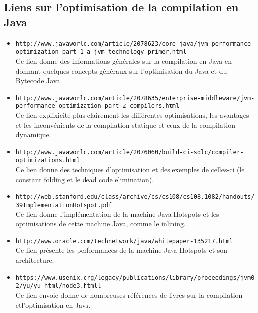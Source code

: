 \documentclass[a4paper]{article}
\begin{document}
\subsection{Liens sur l'optimisation de la compilation en Java}
\begin{itemize}
\item \texttt{http://www.javaworld.com/article/2078623/core-java/jvm-performance-optimization-part-1-a-jvm-technology-primer.html} \\
Ce lien donne des informations générales sur la compilation en Java en donnant quelques concepts généraux sur l'optimisation du Java et du Bytecode Java.\\

\item \texttt{http://www.javaworld.com/article/2078635/enterprise-middleware/jvm-performance-optimization-part-2-compilers.html} \\
Ce lien explixicite plus clairement les différentes optimisations, les avantages et les inconvénients de la compilation statique et ceux de la compilation dynamique.\\

\item \texttt{http://www.javaworld.com/article/2076060/build-ci-sdlc/compiler-optimizations.html} \\
Ce lien donne des techniques d'optimisation et des exemples de celles-ci (le constant folding et le dead code elimination).\\

\item \texttt{http://web.stanford.edu/class/archive/cs/cs108/cs108.1082/handouts/39ImplementationHotspot.pdf} \\
Ce lien donne l'implémentation de la machine Java Hotspots et les optimisations de cette machine Java, comme le inlining.\\

\item \texttt{http://www.oracle.com/technetwork/java/whitepaper-135217.html} \\
Ce lien présente les performances de la machine Java Hotspots et son architecture.\\

\item \texttt{https://www.usenix.org/legacy/publications/library/proceedings/jvm02/yu/yu\_html/node3.htmll} \\
Ce lien envoie donne de nombreuses références de livres sur la compilation etl'optimisation en Java.\\
     \end{itemize}
\end{document}
